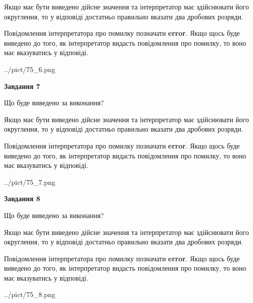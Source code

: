 \documentclass[12pt, ukrainian]{article}
\begin{document}
{\begin {Large}
Якщо має бути виведено дійсне значення та інтерпретатор має здійснювати його округлення, 
то у відповіді достатньо правильно вказати два дробових розряди.

Повідомлення інтерпретатора про помилку позначати \textbf{error}.
Якщо щось буде виведено до того, як інтерпретатор видасть повідомлення про помилку, 
то воно має вказуватись у відповіді. \par

\begin{center}
	{../pict/75_6.png}
\end{center}
\newpage

{\begin {center}\textbf{Завдання 7}\end {center}}\par
Що буде виведено за виконання? \par

Якщо має бути виведено дійсне значення та інтерпретатор має здійснювати його округлення, 
то у відповіді достатньо правильно вказати два дробових розряди.

Повідомлення інтерпретатора про помилку позначати \textbf{error}.
Якщо щось буде виведено до того, як інтерпретатор видасть повідомлення про помилку, 
то воно має вказуватись у відповіді. \par

\begin{center}
	{../pict/75_7.png}
\end{center}
\newpage

{\begin {center}\textbf{Завдання 8}\end {center}}\par
Що буде виведено за виконання? \par

Якщо має бути виведено дійсне значення та інтерпретатор має здійснювати його округлення, 
то у відповіді достатньо правильно вказати два дробових розряди.

Повідомлення інтерпретатора про помилку позначати \textbf{error}.
Якщо щось буде виведено до того, як інтерпретатор видасть повідомлення про помилку, 
то воно має вказуватись у відповіді. \par

\begin{center}
	{../pict/75_8.png}
\end{center}
\newpage


\end{Large}}
\end{document}
